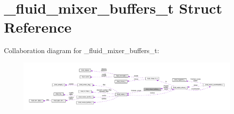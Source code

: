 \hypertarget{struct__fluid__mixer__buffers__t}{}\section{\+\_\+fluid\+\_\+mixer\+\_\+buffers\+\_\+t Struct Reference}
\label{struct__fluid__mixer__buffers__t}


Collaboration diagram for \+\_\+fluid\+\_\+mixer\+\_\+buffers\+\_\+t\+:
\nopagebreak
\begin{figure}[H]
\begin{center}
\leavevmode
\includegraphics[width=350pt]{struct__fluid__mixer__buffers__t__coll__graph}
\end{center}
\end{figure}
